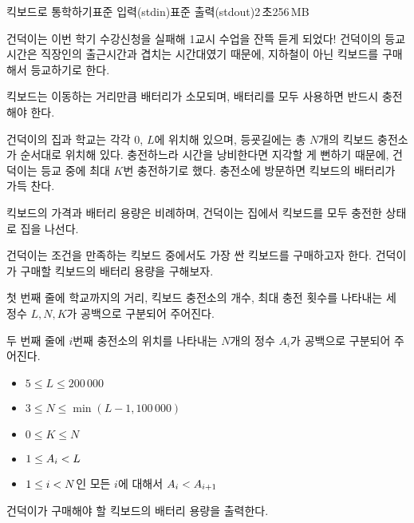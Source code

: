 \begin{problem}{킥보드로 통학하기}{표준 입력(stdin)}{표준 출력(stdout)}{2\,초}{256\,MB}

건덕이는 이번 학기 수강신청을 실패해 1교시 수업을 잔뜩 듣게 되었다! 건덕이의 등교시간은 직장인의 출근시간과 겹치는 시간대였기 때문에, 지하철이 아닌 킥보드를 구매해서 등교하기로 한다.

킥보드는 이동하는 거리만큼 배터리가 소모되며, 배터리를 모두 사용하면 반드시 충전해야 한다.

건덕이의 집과 학교는 각각 $0$, $L$에 위치해 있으며, 등굣길에는 총 $N$개의 킥보드 충전소가 순서대로 위치해 있다. 충전하느라 시간을 낭비한다면 지각할 게 뻔하기 때문에, 건덕이는 등교 중에 최대 $K$번 충전하기로 했다. 충전소에 방문하면 킥보드의 배터리가 가득 찬다.

킥보드의 가격과 배터리 용량은 비례하며, 건덕이는 집에서 킥보드를 모두 충전한 상태로 집을 나선다. 

건덕이는 조건을 만족하는 킥보드 중에서도 가장 싼 킥보드를 구매하고자 한다. 건덕이가 구매할 킥보드의 배터리 용량을 구해보자. 

\InputFile
첫 번째 줄에 학교까지의 거리, 킥보드 충전소의 개수, 최대 충전 횟수를 나타내는 세 정수 $L, N, K$가 공백으로 구분되어 주어진다.

두 번째 줄에 $i$번째 충전소의 위치를 나타내는 $N$개의 정수 $A_i$가 공백으로 구분되어 주어진다.

\newcommand{\lt}{\ensuremath <}
\newcommand{\gt}{\ensuremath >}
\begin{itemize}
 \item $5 \le L \le 200\,000$

 \item $3 \le N \le \min(L - 1, 100\,000)$

 \item $0 \le K \le N$

 \item $1 \le A_i \lt L$

 \item $1 \le i \lt N$인 모든 $i$에 대해서 $A_i \lt A_{i+1}$
\end{itemize}


\OutputFile
건덕이가 구매해야 할 킥보드의 배터리 용량을 출력한다.

\Examples

\begin{example}
%
%
\end{example}

\end{problem}
